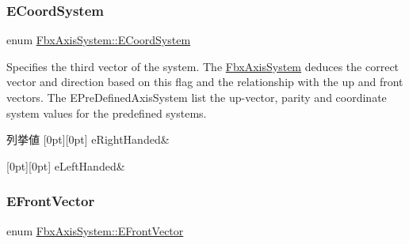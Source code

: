 \subsubsection{\texorpdfstring{E\+Coord\+System}{ECoordSystem}}
{\footnotesize\ttfamily enum \hyperlink{class_fbx_axis_system_a7cf0485846b560fa34f86932c02ec333}{Fbx\+Axis\+System\+::\+E\+Coord\+System}}

Specifies the third vector of the system. The \hyperlink{class_fbx_axis_system}{Fbx\+Axis\+System} deduces the correct vector and direction based on this flag and the relationship with the up and front vectors. The E\+Pre\+Defined\+Axis\+System list the up-\/vector, parity and coordinate system values for the predefined systems. \begin{DoxyEnumFields}{列挙値}
[0pt][0pt]{}\mbox{\label{class_fbx_axis_system_a7cf0485846b560fa34f86932c02ec333abdf1da85a4ef5a2d65c8d6271e3acf6d}} 
e\+Right\+Handed&\\
\hline

[0pt][0pt]{}\mbox{\label{class_fbx_axis_system_a7cf0485846b560fa34f86932c02ec333aecd32fe7557773b957f101f58840b387}} 
e\+Left\+Handed&\\
\hline

\end{DoxyEnumFields}
\mbox{\label{class_fbx_axis_system_a34bce1daad7ed6ae71916bb825d3ec87}} 
\subsubsection{\texorpdfstring{E\+Front\+Vector}{EFrontVector}}
{\footnotesize\ttfamily enum \hyperlink{class_fbx_axis_system_a34bce1daad7ed6ae71916bb825d3ec87}{Fbx\+Axis\+System\+::\+E\+Front\+Vector}}

